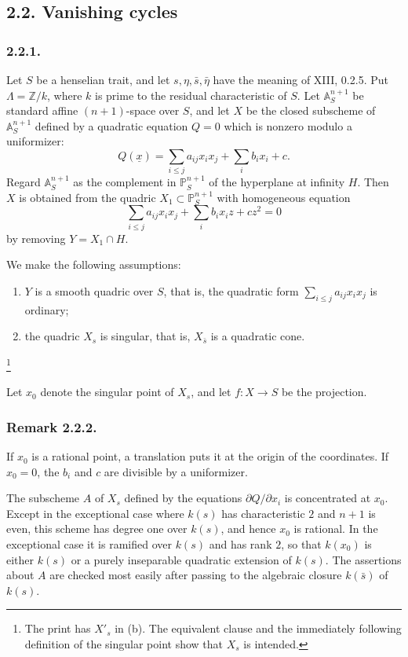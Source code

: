 \subsection*{2.2. Vanishing cycles}

\subsubsection*{2.2.1.}
Let $S$ be a henselian trait, and let
$s,\eta,\bar s,\bar\eta$ have the meaning of XIII, 0.2.5.  Put
$\Lambda=\mathbb Z/k$, where $k$ is prime to the residual
characteristic of $S$.  Let $\mathbb A^{n+1}_S$ be standard affine
$(n+1)$-space over $S$, and let $X$ be the closed subscheme of
$\mathbb A^{n+1}_S$ defined by a quadratic equation $Q=0$ which is
nonzero modulo a uniformizer:
\[
Q(\underline x)=\sum_{i\leq j}a_{ij}x_ix_j+\sum_i b_ix_i+c.
\]
Regard $\mathbb A^{n+1}_S$ as the complement in
$\mathbb P^{n+1}_S$ of the hyperplane at infinity $H$.  Then $X$ is
obtained from the quadric $X_1\subset\mathbb P^{n+1}_S$ with
homogeneous equation
\begin{equation}\tag{2.2.1.1}
\sum_{i\leq j}a_{ij}x_ix_j+\sum_i b_ix_iz+cz^2=0
\end{equation}
by removing $Y=X_1\cap H$.

We make the following assumptions:

\begin{enumerate}
\item[(a)] $Y$ is a smooth quadric over $S$, that is, the quadratic
form $\sum_{i\leq j}a_{ij}x_ix_j$ is ordinary;

\item[(b)] the quadric $X_s$ is singular, that is,
$X_{\bar s}$ is a quadratic cone.
\end{enumerate}
\footnote{The print has $X'_s$ in (b).  The equivalent clause and the
immediately following definition of the singular point show that
$X_s$ is intended.}

Let $x_0$ denote the singular point of $X_s$, and let
$f:X\to S$ be the projection.

\subsubsection*{Remark 2.2.2.}
If $x_0$ is a rational point, a translation puts it at the origin of
the coordinates.  If $x_0=0$, the $b_i$ and $c$ are divisible by a
uniformizer.

The subscheme $A$ of $X_s$ defined by the equations
$\partial Q/\partial x_i$ is concentrated at $x_0$.  Except in the
exceptional case where $k(s)$ has characteristic $2$ and $n+1$ is
even, this scheme has degree one over $k(s)$, and hence $x_0$ is
rational.  In the exceptional case it is ramified over $k(s)$ and
has rank $2$, so that $k(x_0)$ is either $k(s)$ or a purely
inseparable quadratic extension of $k(s)$.  The assertions about
$A$ are checked most easily after passing to the algebraic closure
$k(\bar s)$ of $k(s)$.

